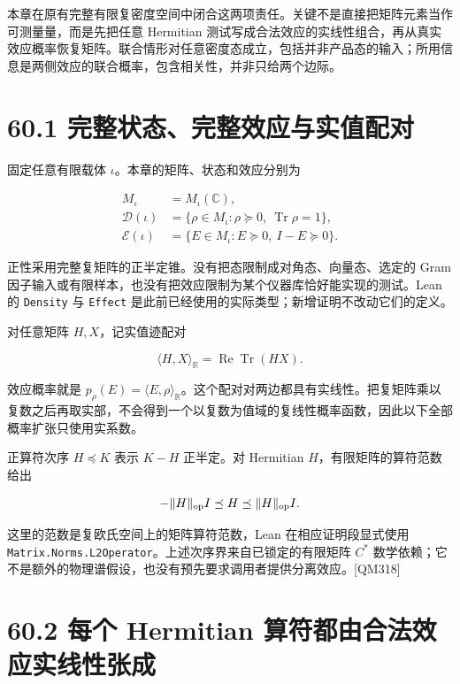\documentclass[
  11pt,
  oneside]{book}
\begin{document}
本章在原有完整有限复密度空间中闭合这两项责任。关键不是直接把矩阵元素当作可测量量，而是先把任意
Hermitian
测试写成合法效应的实线性组合，再从真实效应概率恢复矩阵。联合情形对任意密度态成立，包括并非产品态的输入；所用信息是两侧效应的联合概率，包含相关性，并非只给两个边际。

\section{60.1 完整状态、完整效应与实值配对}

固定任意有限载体 \(\iota\)。本章的矩阵、状态和效应分别为

\[
\begin{aligned}
M_\iota&=M_\iota(\mathbb C),\\
\mathcal D(\iota)&=\{\rho\in M_\iota:\rho\succeq0,\ \operatorname{Tr}\rho=1\},\\
\mathcal E(\iota)&=\{E\in M_\iota:E\succeq0,\ I-E\succeq0\}.
\end{aligned}
\]

正性采用完整复矩阵的正半定锥。没有把态限制成对角态、向量态、选定的 Gram
因子输入或有限样本，也没有把效应限制为某个仪器库恰好能实现的测试。Lean
的 \texttt{Density} 与 \texttt{Effect}
是此前已经使用的实际类型；新增证明不改动它们的定义。

对任意矩阵 \(H,X\)，记实值迹配对

\[
\langle H,X\rangle_{\mathbb R}
=\operatorname{Re}\operatorname{Tr}(HX).
\]

效应概率就是
\(p_\rho(E)=\langle E,\rho\rangle_{\mathbb R}\)。这个配对对两边都具有实线性。把复矩阵乘以复数之后再取实部，不会得到一个以复数为值域的复线性概率函数，因此以下全部概率扩张只使用实系数。

正算符次序 \(H\preceq K\) 表示 \(K-H\) 正半定。对 Hermitian
\(H\)，有限矩阵的算符范数给出

\[
-\|H\|_{\rm op}I\preceq H\preceq\|H\|_{\rm op}I.
\]

这里的范数是复欧氏空间上的矩阵算符范数，Lean 在相应证明段显式使用
\texttt{Matrix.\allowbreak Norms.\allowbreak L2\allowbreak Operator}。上述次序界来自已锁定的有限矩阵 \(C^*\)
数学依赖；它不是额外的物理谱假设，也没有预先要求调用者提供分离效应。{[}QM318{]}

\section{60.2 每个 Hermitian 算符都由合法效应实线性张成}

\protect\hypertarget{p-sep-01}{}{}
\end{document}
